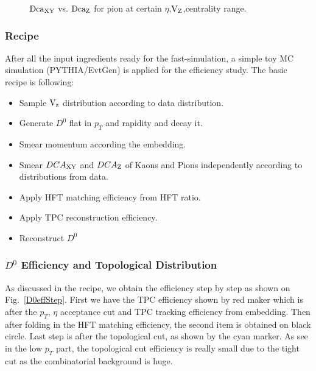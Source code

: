 \begin{figure}[htbp]
\begin{minipage}[htbp]{0.52\linewidth}
\caption{$\textup{Dca}_{\textup{XY}}$ vs. $\textup{Dca}_\textup{Z}$ for pion at certain $\eta$,$\textup{V}_{\textup{Z}}$,centrality range. \label{DcaExample}}
\end{minipage}
\end{figure}

\subsubsection{Recipe}
\label{recipe}
After all the input ingredients ready for the fast-simulation, a simple toy MC simulation (PYTHIA/EvtGen) is applied for the efficiency study. The basic recipe is following:
\begin{itemize}
\item Sample $\textup{V}_\textup{z}$ distribution according to data distribution.
\item Generate $D^0$ flat in $p_T$ and rapidity and decay it.
\item Smear momentum according the embedding.
\item Smear $DCA_{\textup{XY}}$ and $DCA_\textup{Z}$ of Kaons and Pions independently according to distributions from data.
\item Apply HFT matching efficiency from HFT ratio.
\item Apply TPC reconstruction efficiency.
\item Reconstruct $D^0$
\end{itemize}

\subsubsection{$D^0$ Efficiency and Topological Distribution}

As discussed in the recipe, we obtain the efficiency step by step as shown on Fig.~\ref{D0effStep}. First we have the TPC efficiency shown by red maker which is after the $p_T$, $\eta$ acceptance cut and TPC tracking efficiency from embedding. Then after folding in the HFT matching efficiency, the second item is obtained on black circle. Last step is after the topological cut, as shown by the cyan marker. As see in the low $p_T$ part, the topological cut efficiency is really small due to the tight cut as the combinatorial background is huge.

